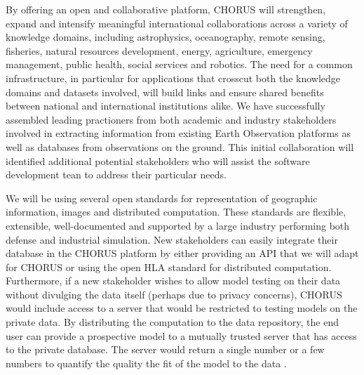 By offering an open and collaborative platform, CHORUS will
strengthen, expand and intensify meaningful international
collaborations across a variety of knowledge domains, including
astrophysics, oceanography, remote sensing, fisheries, natural
resources development, energy, agriculture, emergency management,
public health, social services and robotics.  The need for a common
infrastructure, in particular for applications that crosscut both the
knowledge domains and datasets involved, will build links and ensure
shared benefits between national and international institutions alike.
We have successfully assembled leading practioners from both academic
and industry stakeholders involved in extracting information from
existing Earth Observation platforms as well as databases from
observations on the ground.  This initial collaboration will identified
additional potential stakeholders who will assist the software development
tean to address their particular needs.

We will be using several open standards for representation of
geographic information, images and distributed computation.  These
standards are flexible, extensible, well-documented and supported by a
large industry performing both defense and industrial simulation.  New
stakeholders can easily integrate their database in the CHORUS
platform by either providing an API that we will adapt for CHORUS or
using the open HLA standard for distributed computation.  Furthermore,
if a new stakeholder wishes to allow model testing on their data
without divulging the data itself (perhaps due to privacy concerns),
CHORUS would include access to a server that would be restricted to
testing models on the private data.  By distributing the computation
to the data repository, the end user can provide a prospective model
to a mutually trusted server that has access to the private database.
The server would return a single number or a few numbers to quantify
the quality the fit of the model to the data .  
          
